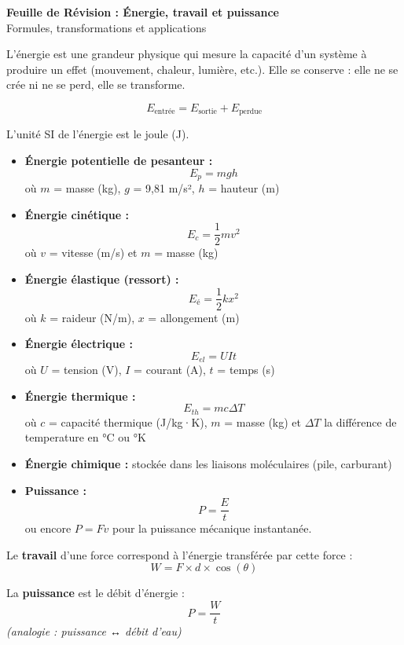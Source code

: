 \documentclass[11pt,a4paper]{article}
\newcommand{\rulebox}[3]{
\begin{tcolorbox}[colback=#1!10!white,colframe=#1!60!black,title=\textbf{#2}]
#3
\end{tcolorbox}
}
\begin{document}
\begin{center}
{\LARGE \textbf{Feuille de Révision : Énergie, travail et puissance}}\\[0.5cm]
{\large Formules, transformations et applications}
\end{center}

\rulebox{blue}{Qu’est-ce que l’énergie ?}{
L’énergie est une grandeur physique qui mesure la capacité d’un système à produire un effet (mouvement, chaleur, lumière, etc.).  
Elle se conserve : elle ne se crée ni ne se perd, elle se transforme.

\[
E_\text{entrée} = E_\text{sortie} + E_\text{perdue}
\]

L’unité SI de l’énergie est le joule (J).
}

\rulebox{green}{Les formes d’énergie et leurs formules principales}{
\begin{itemize}
\item \textbf{Énergie potentielle de pesanteur :}
\[
E_p = m g h
\]
où $m$ = masse (kg), $g$ = 9,81 m/s², $h$ = hauteur (m)

\item \textbf{Énergie cinétique :}
\[
E_c = \frac{1}{2} m v^2
\]
où $v$ = vitesse (m/s) et $m$ = masse (kg)

\item \textbf{Énergie élastique (ressort) :}
\[
E_{é} = \frac{1}{2} k x^2
\]
où $k$ = raideur (N/m), $x$ = allongement (m)

\item \textbf{Énergie électrique :}
\[
E_{el} = U I t
\]
où $U$ = tension (V), $I$ = courant (A), $t$ = temps (s)

\item \textbf{Énergie thermique :}
\[
E_{th} = m c \Delta T
\]
où $c$ = capacité thermique (J/kg·K), $m$ = masse (kg) et $\Delta T$ la différence de temperature en °C ou °K

\item \textbf{Énergie chimique :} stockée dans les liaisons moléculaires (pile, carburant)

\item \textbf{Puissance :}
\[
P = \frac{E}{t}
\]
ou encore $P = F v$ pour la puissance mécanique instantanée.
\end{itemize}
}

\rulebox{orange}{Travail et puissance}{
Le \textbf{travail} d’une force correspond à l’énergie transférée par cette force :
\[
W = F \times d \times \cos(\theta)
\]

La \textbf{puissance} est le débit d’énergie :
\[
P = \frac{W}{t}
\]
\textit{(analogie : puissance ↔ débit d’eau)}
}
\end{document}
